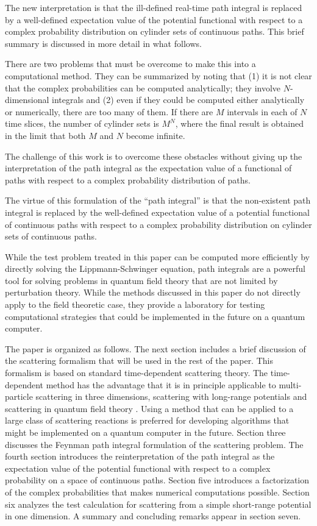 \documentclass[aps,prc,reprint,noshowpacs,groupedaddress,onecolumn]{revtex4}
\begin{document}
The new interpretation is that the ill-defined real-time path integral is
replaced by a well-defined expectation value of the potential
functional with respect to a complex probability distribution on
cylinder sets of continuous paths.  This brief summary is discussed in
more detail in what follows.

There are two problems that must be overcome to make this into a
computational method.  They can be summarized by noting that (1) it is
not clear that the complex probabilities can be computed analytically;
they involve $N$-dimensional integrals and (2) even if they could be
computed either analytically or numerically, there are too many of
them.  If there are $M$ intervals in each of $N$ time slices, the number of
cylinder sets is $M^N$, where the final result is obtained in the
limit that both $M$ and $N$ become infinite.

The challenge of this work is to overcome these obstacles
without giving up the interpretation of the path integral as the
expectation value of a functional of paths with respect to a complex
probability distribution of paths.

The virtue of this formulation of the ``path integral'' is that the
non-existent path integral is replaced by the well-defined expectation
value of a potential functional of continuous paths with respect to a
complex probability distribution on cylinder sets of continuous paths.

While the test problem treated in this paper can be computed more
efficiently by directly solving the Lippmann-Schwinger equation, path
integrals are a powerful tool for solving problems in quantum field
theory that are not limited by perturbation theory.  While the methods
discussed in this paper do not directly apply to the field theoretic
case,
they provide a laboratory for testing computational strategies that
could be implemented in the future on a quantum computer.

The paper is organized as follows.  The next section includes a brief
discussion of the scattering formalism that will be used in the rest
of the paper.  This formalism is based on standard time-dependent
scattering theory. The time-dependent method has the advantage that it
is in principle applicable to multi-particle scattering in three
dimensions, scattering with long-range potentials \cite{Dollard}
\cite{dollard:1978we} and scattering in quantum field theory
\cite{Haag:1958vt}\cite{Ruelle:1962}.  Using a method that can be
applied to a large class of scattering reactions is preferred for
developing algorithms that might be implemented on a quantum computer
in the future.  Section three discusses the Feynman path integral
formulation of the scattering problem.  The fourth section introduces
the reinterpretation of the path integral as the expectation value of
the potential functional with respect to a complex probability on a
space of continuous paths.  Section five introduces a factorization of
the complex probabilities that makes numerical computations possible.
Section six analyzes the test calculation for scattering from a simple
short-range potential in one dimension.  A summary and concluding
remarks appear in section seven.
 
\end{document}
